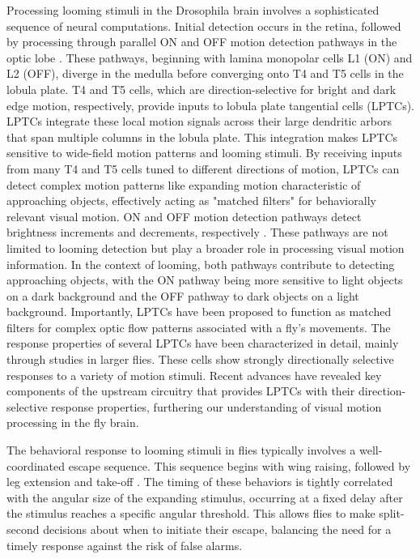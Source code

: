 \documentclass[../main/thesis_msc.tex]{subfiles}
\begin{document}
	Processing looming stimuli in the Drosophila brain involves a sophisticated sequence of neural computations. Initial detection occurs in the retina, followed by processing through parallel ON and OFF motion detection pathways in the optic lobe \autocite{klapoetke_ultra-selective_2017}. These pathways, beginning with lamina monopolar cells L1 (ON) and L2 (OFF), diverge in the medulla before converging onto T4 and T5 cells in the lobula plate. T4 and T5 cells, which are direction-selective for bright and dark edge motion, respectively, provide inputs to lobula plate tangential cells (LPTCs). LPTCs integrate these local motion signals across their large dendritic arbors that span multiple columns in the lobula plate. This integration makes LPTCs sensitive to wide-field motion patterns and looming stimuli. By receiving inputs from many T4 and T5 cells tuned to different directions of motion, LPTCs can detect complex motion patterns like expanding motion characteristic of approaching objects, effectively acting as "matched filters" for behaviorally relevant visual motion. ON and OFF motion detection pathways detect brightness increments and decrements, respectively \autocite{behnia_processing_2014}. These pathways are not limited to looming detection but play a broader role in processing visual motion information. In the context of looming, both pathways contribute to detecting approaching objects, with the ON pathway being more sensitive to light objects on a dark background and the OFF pathway to dark objects on a light background. Importantly, LPTCs have been proposed to function as matched filters for complex optic flow patterns associated with a fly's movements. The response properties of several LPTCs have been characterized in detail, mainly through studies in larger flies. These cells show strongly directionally selective responses to a variety of motion stimuli. Recent advances have revealed key components of the upstream circuitry that provides LPTCs with their direction-selective response properties, furthering our understanding of visual motion processing in the fly brain.

	The behavioral response to looming stimuli in flies typically involves a well-coordinated escape sequence. This sequence begins with wing raising, followed by leg extension and take-off \autocite{card_performance_2008, fotowat_novel_2009}. The timing of these behaviors is tightly correlated with the angular size of the expanding stimulus, occurring at a fixed delay after the stimulus reaches a specific angular threshold. This allows flies to make split-second decisions about when to initiate their escape, balancing the need for a timely response against the risk of false alarms.
\end{document}
